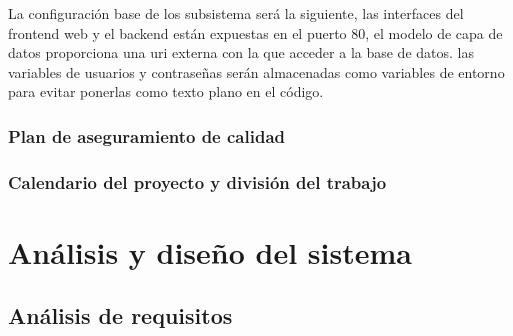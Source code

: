 \documentclass{article}
\begin{document}
La configuración base de los subsistema será la siguiente, las interfaces del frontend web y el backend están expuestas en el puerto 80, el modelo de capa de datos proporciona una uri externa con la que acceder a la base de datos. las variables de usuarios y contraseñas serán almacenadas como variables de entorno para evitar ponerlas como texto plano en el código.

\subsubsection{Plan de aseguramiento de calidad}

\subsubsection{Calendario del proyecto y división del trabajo}

\pagebreak

\section{Análisis y diseño del sistema}

\subsection{Análisis de requisitos}
\end{document}
